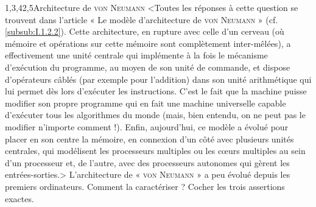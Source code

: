 \vspace*{6pt}

\begin{quiz}[title={Entrailles et contexte d'un objet numérique}]
\vspace{-\baselineskip}
\begin{quizquestion}[c]{1,3,4}{2,5}{Architecture de {\scshape von Neumann}}
<Toutes les réponses à cette question se trouvent dans l'article « Le modèle d'architecture de {\scshape von Neumann} » (cf. \cref{subsub:I.1.2.2}). Cette architecture, en rupture avec celle d'un cerveau (où mémoire et opérations sur cette mémoire sont complètement inter-mêlées), a effectivement une unité centrale qui implémente à la fois le mécanisme d'exécution du programme, au moyen de son unité de commande, et dispose d'opérateurs câblés (par exemple pour l'addition) dans son unité arithmétique qui lui permet dès lors d'exécuter les instructions. C'est le fait que la machine puisse modifier son propre programme qui en fait une machine universelle capable d'exécuter tous les algorithmes du monde (mais, bien entendu,  on ne peut pas le modifier n'importe comment !). Enfin, aujourd'hui, ce modèle a évolué pour placer en son centre la mémoire, en connexion d'un côté avec plusieurs unités centrales, qui modélisent les processeurs multiples ou les cœurs multiples au sein d'un processeur et, de l'autre, avec des processeurs autonomes qui gèrent les entrées-sorties.>
L'architecture de « \textsc{von Neumann} » a peu évolué depuis les premiers ordinateurs. Comment la caractériser ?
Cocher les trois assertions exactes.
\end{quizquestion}


\end{quiz}
